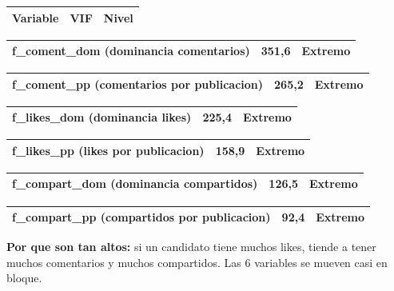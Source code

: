 \documentclass[11pt,a4paper]{article}
\begin{document}
{\begin{center}
\begin{tabular}{lll}
\hline
Variable & VIF & Nivel \\
\hline
\end{tabular}
\end{center}
\begin{center}
\begin{tabular}{lll}
\hline
f_coment_dom (dominancia comentarios) & 351,6 & Extremo \\
\hline
\end{tabular}
\end{center}
\begin{center}
\begin{tabular}{lll}
\hline
f_coment_pp (comentarios por publicacion) & 265,2 & Extremo \\
\hline
\end{tabular}
\end{center}
\begin{center}
\begin{tabular}{lll}
\hline
f_likes_dom (dominancia likes) & 225,4 & Extremo \\
\hline
\end{tabular}
\end{center}
\begin{center}
\begin{tabular}{lll}
\hline
f_likes_pp (likes por publicacion) & 158,9 & Extremo \\
\hline
\end{tabular}
\end{center}
\begin{center}
\begin{tabular}{lll}
\hline
f_compart_dom (dominancia compartidos) & 126,5 & Extremo \\
\hline
\end{tabular}
\end{center}
\begin{center}
\begin{tabular}{lll}
\hline
f_compart_pp (compartidos por publicacion) & 92,4 & Extremo \\
\hline
\end{tabular}
\end{center}

\textbf{Por que son tan altos:} si un candidato tiene muchos likes, tiende a tener muchos comentarios y muchos compartidos. Las 6 variables se mueven casi en bloque.\\[2pt]

}
\end{document}
